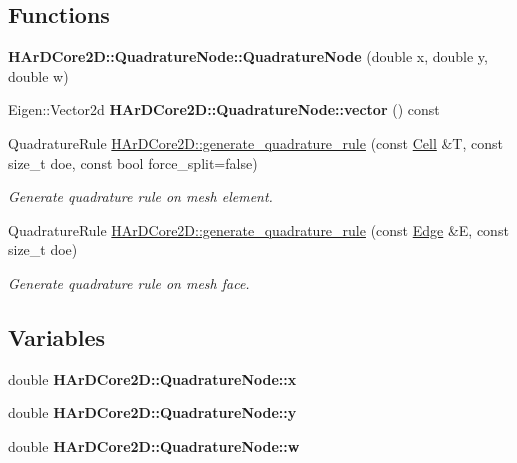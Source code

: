 \subsection*{Functions}
\begin{DoxyCompactItemize}
\item 
\mbox{\label{group__Quadratures_gae76e5c50d31061d72d153133718428bb}} 
{\bfseries H\+Ar\+D\+Core2\+D\+::\+Quadrature\+Node\+::\+Quadrature\+Node} (double x, double y, double w)
\item 
\mbox{\label{group__Quadratures_ga27f8f3696a0be686ed1606dda2425da6}} 
Eigen\+::\+Vector2d {\bfseries H\+Ar\+D\+Core2\+D\+::\+Quadrature\+Node\+::vector} () const
\item 
Quadrature\+Rule \hyperlink{group__Quadratures_gaccff0bc4833f415d2160633e2d93ccc3}{H\+Ar\+D\+Core2\+D\+::generate\+\_\+quadrature\+\_\+rule} (const \hyperlink{classHArDCore2D_1_1Cell}{Cell} \&T, const size\+\_\+t doe, const bool force\+\_\+split=false)
\begin{DoxyCompactList}\small\item\em Generate quadrature rule on mesh element. \end{DoxyCompactList}\item 
Quadrature\+Rule \hyperlink{group__Quadratures_ga919c5b682e3c7dc3cef895b32a86ec7d}{H\+Ar\+D\+Core2\+D\+::generate\+\_\+quadrature\+\_\+rule} (const \hyperlink{classHArDCore2D_1_1Edge}{Edge} \&E, const size\+\_\+t doe)
\begin{DoxyCompactList}\small\item\em Generate quadrature rule on mesh face. \end{DoxyCompactList}\end{DoxyCompactItemize}
\subsection*{Variables}
\begin{DoxyCompactItemize}
\item 
\mbox{\label{group__Quadratures_ga628eb81f57259847bbc6250bc2fc7a47}} 
double {\bfseries H\+Ar\+D\+Core2\+D\+::\+Quadrature\+Node\+::x}
\item 
\mbox{\label{group__Quadratures_gabd7b50c9a348283e18d94c9e4dba8982}} 
double {\bfseries H\+Ar\+D\+Core2\+D\+::\+Quadrature\+Node\+::y}
\item 
\mbox{\label{group__Quadratures_ga5ff899e851df60680e721740e4176fc0}} 
double {\bfseries H\+Ar\+D\+Core2\+D\+::\+Quadrature\+Node\+::w}
\end{DoxyCompactItemize}


